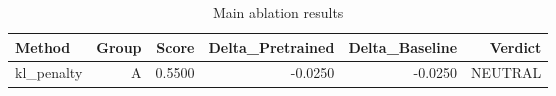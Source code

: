 \begin{table}[htbp]
\centering
\caption{Main ablation results}
\label{tab:main-results}
\begin{tabular}{lrrrrr}
\toprule
\textbf{Method} & \textbf{Group} & \textbf{Score} & \textbf{Delta\_Pretrained} & \textbf{Delta\_Baseline} & \textbf{Verdict} \\
\midrule
kl\_penalty & A & 0.5500 & -0.0250 & -0.0250 & NEUTRAL \\
\bottomrule
\end{tabular}
\end{table}